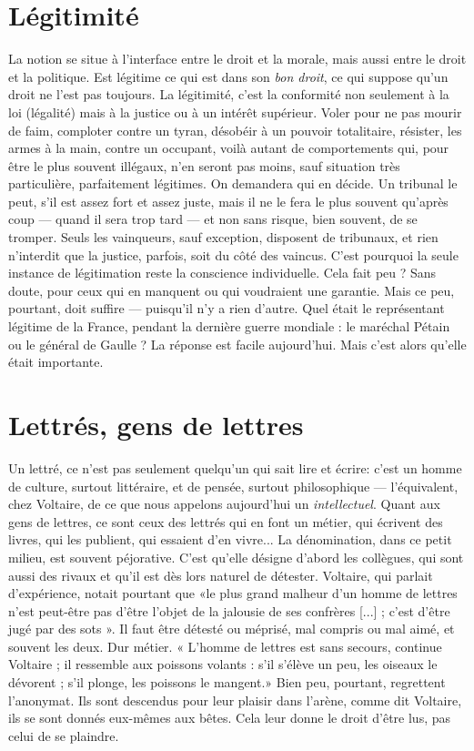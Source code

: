 {\section{Légitimité}
La notion se situe à l'interface entre le droit et la morale,
mais aussi entre le droit et la politique. Est légitime ce qui est
dans son {\it bon droit}, ce qui suppose qu’un droit ne l’est pas toujours. La légitimité,
c’est la conformité non seulement à la loi (légalité) mais à la justice ou à
un intérêt supérieur. Voler pour ne pas mourir de faim, comploter contre un
tyran, désobéir à un pouvoir totalitaire, résister, les armes à la main, contre un
occupant, voilà autant de comportements qui, pour être le plus souvent illégaux,
n'en seront pas moins, sauf situation très particulière, parfaitement légitimes.
On demandera qui en décide. Un tribunal le peut, s’il est assez fort et
assez juste, mais il ne le fera le plus souvent qu’après coup — quand il sera trop
tard — et non sans risque, bien souvent, de se tromper. Seuls les vainqueurs,
sauf exception, disposent de tribunaux, et rien n’interdit que la justice, parfois,
soit du côté des vaincus. C’est pourquoi la seule instance de légitimation reste
la conscience individuelle. Cela fait peu ? Sans doute, pour ceux qui en manquent
ou qui voudraient une garantie. Mais ce peu, pourtant, doit suffire —
puisqu'il n’y a rien d’autre. Quel était le représentant légitime de la France,
pendant la dernière guerre mondiale : le maréchal Pétain ou le général de
Gaulle ? La réponse est facile aujourd’hui. Mais c’est alors qu’elle était importante.

\section{Lettrés, gens de lettres}
Un lettré, ce n’est pas seulement quelqu'un
qui sait lire et écrire: c’est un
homme de culture, surtout littéraire, et de pensée, surtout philosophique —
l'équivalent, chez Voltaire, de ce que nous appelons aujourd’hui un {\it intellectuel}.
Quant aux gens de lettres, ce sont ceux des lettrés qui en font un
métier, qui écrivent des livres, qui les publient, qui essaient d’en vivre... La
dénomination, dans ce petit milieu, est souvent péjorative. C’est qu’elle
désigne d’abord les collègues, qui sont aussi des rivaux et qu’il est dès lors
naturel de détester. Voltaire, qui parlait d'expérience, notait pourtant que
«le plus grand malheur d’un homme de lettres n’est peut-être pas d’être
l’objet de la jalousie de ses confrères [...] ; c’est d’être jugé par des sots ». Il
faut être détesté ou méprisé, mal compris ou mal aimé, et souvent les deux.
Dur métier. « L'homme de lettres est sans secours, continue Voltaire ; il ressemble
aux poissons volants : s’il s'élève un peu, les oiseaux le dévorent ; s’il
plonge, les poissons le mangent.» Bien peu, pourtant, regrettent l’anonymat.
Ils sont descendus pour leur plaisir dans l'arène, comme dit Voltaire,
ils se sont donnés eux-mêmes aux bêtes. Cela leur donne le droit d’être lus,
pas celui de se plaindre.

}
